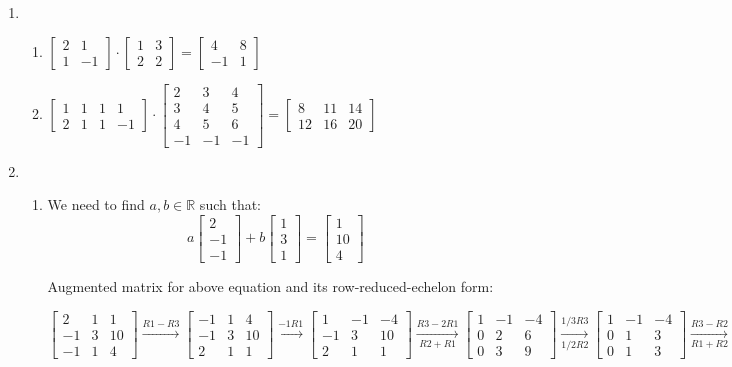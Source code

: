 \documentclass[letter]{article}
\newcommand{\mat}[1]{\begin{bmatrix}#1\end{bmatrix}}
\begin{document}
\begin{enumerate}
	    \item 
	        \begin{enumerate}
	            \item $\mat{2 & 1 \\ 1 & -1} \cdot \mat{1 & 3 \\ 2 & 2} = \mat{4 & 8 \\ -1 & 1}$
	            \item $\mat{1 & 1 & 1 & 1\\ 2 & 1 & 1 & -1} \cdot \mat{2 & 3 & 4 \\ 3 & 4 & 5 \\  4 & 5 & 6 \\ -1 & -1 & -1} = \mat{8 & 11 & 14 \\ 12 & 16 & 20} $
	        \end{enumerate}
	        
	    \item
	        \begin{enumerate}
	            \item We need to find $a, b \in \mathbb{R}$ such that:
	                $$ a \mat{2 \\ -1 \\ -1} + b \mat{1 \\ 3 \\ 1} = \mat{1 \\ 10 \\ 4}$$
	                
	            Augmented matrix for above equation and its row-reduced-echelon form:
	            
	                $ \mat{2 & 1 & 1 \\ - 1& 3 & 10 \\ -1 & 1 & 4} \xrightarrow{R1 - R3} \mat{-1 & 1 & 4 \\ -1 & 3 & 10 \\ 2 & 1 & 1} \xrightarrow{-1 R 1} \mat{1 & -1 & -4 \\ -1 & 3 & 10 \\ 2 & 1 & 1} \xrightarrow[R2 + R1]{ R3 - 2 R1} \mat{1 & -1 & -4 \\ 0 & 2 & 6 \\ 0 & 3 & 9 } \xrightarrow[1/2 R2]{1/3 R3} \mat{1 & -1 & -4 \\ 0 & 1 & 3\\ 0 & 1 & 3} \xrightarrow[R1 + R2]{ R3 - R2} \mat{1 & 0 & - 1\\ 0 & 1 & 3 \\ 0 & 0 & 0 }$
	                

\end{enumerate}
\end{enumerate}
\end{document}
